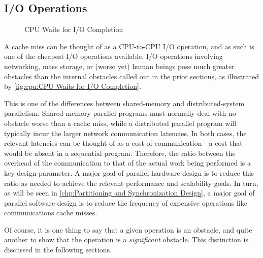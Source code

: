 \QuickQuizEnd

\subsection{I/O Operations}
\label{sec:cpu:I/O Operations}

\begin{figure}
\centering
{}
\caption{CPU Waits for I/O Completion}
\end{figure}

A cache miss can be thought of as a CPU-to-CPU I/O operation, and as
such is one of the cheapest I/O operations available.
I/O operations involving networking, mass storage, or (worse yet) human
beings pose much greater obstacles than the internal obstacles called
out in the prior sections,
as illustrated by
\cref{fig:cpu:CPU Waits for I/O Completion}.

This is one of the differences between shared-memory and distributed-system
parallelism:
Shared-memory parallel programs must normally deal with no
obstacle worse than a cache miss, while a distributed parallel program
will typically incur the larger network communication latencies.
In both cases, the relevant latencies can be thought of as a cost of
communication---a cost that would be absent in a sequential program.
Therefore, the ratio between the overhead of the communication to
that of the actual work being performed is a key design parameter.
A major goal of parallel hardware design is to reduce this ratio as
needed to achieve the relevant performance and scalability goals.
In turn, as will be seen in
\cref{chp:Partitioning and Synchronization Design},
a major goal of parallel software design is to reduce the
frequency of expensive operations like communications cache misses.

Of course, it is one thing to say that a given operation is an obstacle,
and quite another to show that the operation is a \emph{significant}
obstacle.
This distinction is discussed in the following sections.
